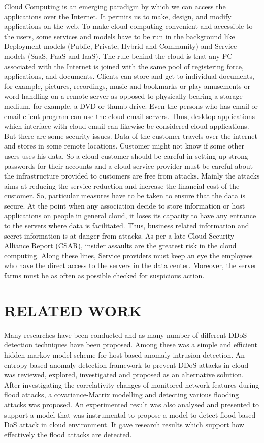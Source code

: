 \documentclass[letterpaper, 10 pt, conference]{ieeeconf}  %
\begin{document}
Cloud Computing is an emerging paradigm by which we can access the applications over the Internet. It permits us to make, design, and modify applications on the web. To make cloud computing convenient and accessible to the users, some services and models have to be run in the background like Deployment models (Public, Private, Hybrid and Community) and Service models (SaaS, PaaS and IaaS). The rule behind the cloud is that any PC associated with the Internet is joined with the same pool of registering force, applications, and documents. Clients can store and get to individual documents, for example,  pictures, recordings, music and bookmarks or play amusements or word handling on a remote server as opposed to physically bearing a storage medium, for example, a DVD or thumb drive. Even the persons who has email or email client program can use the cloud email servers. Thus, desktop applications which interface with cloud email can likewise be considered cloud applications. 
But there are some security issues. Data of the customer travels over the internet and stores in some remote locations. Customer might not know if some other users uses his data. So a cloud customer should be careful in setting up strong passwords for their accounts and a cloud service provider must be careful about the infrastructure provided to customers are free from attacks. Mainly the attacks aims at reducing the service reduction and increase the financial cost of the customer. So, particular measures have to be taken to ensure that the data is secure.
At the point when any association decide to store information or host applications on people in general cloud, it loses its capacity to have any entrance to the servers where data is facilitated. Thus, business related information and secret information is at danger from attacks. As per a late Cloud Security Alliance Report (CSAR), insider assaults are the greatest risk in the cloud computing. Along these lines, Service providers must keep an eye the employees who have the direct access to the servers in the data center. Moreover, the server farms must be as often as possible checked for suspicious action.



\section{ RELATED WORK}

Many researches have been conducted and as many number of different DDoS detection techniques have been proposed. Among these was a simple and efficient hidden markov model scheme for host based anomaly intrusion detection. An entropy based anomaly detection framework to prevent DDoS attacks in cloud was reviewed, explored, investigated and proposed as an alternative solution.
After investigating the correlativity changes of monitored network features during flood attacks, a covariance-Matrix modelling and detecting various flooding attacks was proposed. An experimented result was also analysed and presented to support a model that was instrumental to propose a model to detect flood based DoS attack in cloud environment. It gave research results which support how effectively the flood attacks are detected.
\end{document}
